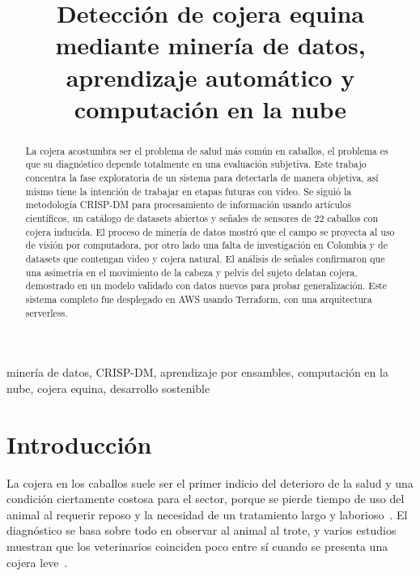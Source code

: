 \documentclass[conference,a4paper]{IEEEtran}
\begin{document}
\title{Detección de cojera equina mediante minería de datos, aprendizaje automático y computación en la nube}

\author{
}

\maketitle

\begin{abstract}
La cojera acostumbra ser el problema de salud más común en caballos, el problema es que su diagnóstico depende totalmente en una evaluación subjetiva. Este trabajo concentra la fase exploratoria de un sistema para detectarla de manera objetiva, así mismo tiene la intención de trabajar en etapas futuras con video. Se siguió la metodología CRISP-DM para procesamiento de información usando artículos científicos, un catálogo de datasets abiertos y señales de sensores de 22 caballos con cojera inducida. El proceso de minería de datos mostró que el campo se proyecta al uso de visión por computadora, por otro lado una falta de investigación en Colombia y de datasets que contengan video y cojera natural. El análisis de señales confirmaron que una asimetría en el movimiento de la cabeza y pelvis del sujeto delatan cojera, demostrado en un modelo validado con datos nuevos para probar generalización. Este sistema completo fue desplegado en AWS usando Terraform, con una arquitectura serverless.
\end{abstract}

\begin{IEEEkeywords}
minería de datos, CRISP-DM, aprendizaje por ensambles, computación en la nube, cojera equina, desarrollo sostenible
\end{IEEEkeywords}

\section{Introducción}

La cojera en los caballos suele ser el primer indicio del deterioro de la salud y una condición ciertamente costosa para el sector, porque se pierde tiempo de uso del animal al requerir reposo y la necesidad de un tratamiento largo y laborioso~\cite{nehs2013,usda1998}. El diagnóstico se basa sobre todo en observar al animal al trote, y varios estudios muestran que los veterinarios coinciden poco entre sí cuando se presenta una cojera leve~\cite{keegan2010,hammarberg2016}.
\end{document}
